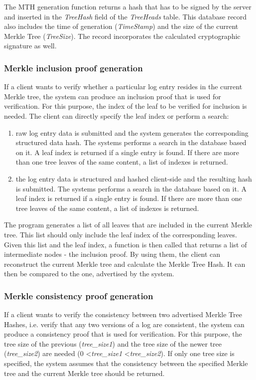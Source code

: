 \documentclass{article}
\begin{document}
	The MTH generation function returns a hash that has to be signed by the server and inserted in the \textit{TreeHash} field of the \textit{TreeHeads} table. This database record also includes the time of generation (\textit{TimeStamp}) and the size of the current Merkle Tree (\textit{TreeSize}). The record incorporates the calculated cryptographic signature as well. 
	
	\subsubsection{Merkle inclusion proof generation}
	If a client wants to verify whether a particular log entry resides in the current Merkle tree, the system can produce an inclusion proof that is used for verification. For this purpose, the index of the leaf to be verified for inclusion is needed. The client can directly specify the leaf index or perform a search:
	
	\begin{enumerate}
		\item raw log entry data is submitted and the system generates the corresponding structured data hash. The systems performs a search in the database based on it. A leaf index is returned if a single entry is found. If there are more than one tree leaves of the same content, a list of indexes is returned.
		\item the log entry data is structured and hashed client-side and the resulting hash is submitted. The systems performs a search in the database based on it. A leaf index is returned if a single entry is found. If there are more than one tree leaves of the same content, a list of indexes is returned.
	\end{enumerate}

	The program generates a list of all leaves that are included in the current Merkle tree. This list should only include the leaf index of the corresponding leaves. Given this list and the leaf index, a function is then called that returns a list of intermediate nodes - the inclusion proof. By using them, the client can reconstruct the current Merkle tree and calculate the Merkle Tree Hash. It can then be compared to the one, advertised by the system. 
	
	\subsubsection{Merkle consistency proof generation}
	If a client wants to verify the consistency between two advertised Merkle Tree Hashes, i.e. verify that any two versions of a log are consistent, the system can produce a consistency proof that is used for verification. For this purpose, the tree size of the previous (\textit{tree\_size1}) and the tree size of the newer tree (\textit{tree\_size2}) are needed (0 \textless \textit{tree\_size1} \textless  \textit{tree\_size2}). If only one tree size is specified, the system assumes that the consistency between the specified Merkle tree and the current Merkle tree should be returned.
	
\end{document}
